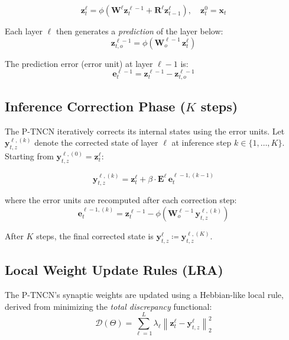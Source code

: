\documentclass[11pt]{article}
\theoremstyle{definition}
\newcommand{\vz}{\mathbf{z}}
\newcommand{\vy}{\mathbf{y}}
\newcommand{\ve}{\mathbf{e}}
\newcommand{\vx}{\mathbf{x}}
\newcommand{\W}{\mathbf{W}}
\newcommand{\R}{\mathbf{R}}
\newcommand{\E}{\mathbf{E}}
\newcommand{\norm}[1]{\left\|#1\right\|}
\begin{document}
\begin{equation}
  \label{eq:state_update}
  \vz^\ell_t = \phi\!\left(\W^\ell \vz^{\ell-1}_t + \R^\ell \vz^\ell_{t-1}\right),
  \quad \vz^0_t = \vx_t
\end{equation}

Each layer $\ell$ then generates a \emph{prediction} of the layer below:
\begin{equation}
  \label{eq:prediction}
  \vz^{\ell-1}_{t,o} = \phi\!\left(\W^{\ell-1}_o \, \vz^\ell_t\right)
\end{equation}

The prediction error (error unit) at layer $\ell-1$ is:
\begin{equation}
  \label{eq:error_unit}
  \ve^{\ell-1}_t = \vz^{\ell-1}_t - \vz^{\ell-1}_{t,o}
\end{equation}

\subsection{Inference Correction Phase ($K$ steps)}

The P-TNCN iteratively corrects its internal states using the error units.
Let $\vy^{\ell,(k)}_{t,z}$ denote the corrected state of layer $\ell$ at
inference step $k \in \{1,\ldots,K\}$. Starting from $\vy^{\ell,(0)}_{t,z} = \vz^\ell_t$:

\begin{equation}
  \label{eq:correction}
  \vy^{\ell,(k)}_{t,z} = \vz^\ell_t + \beta \cdot \E^\ell \, \ve^{\ell-1,(k-1)}_t
\end{equation}

where the error units are recomputed after each correction step:
\begin{equation}
  \ve^{\ell-1,(k)}_t = \vz^{\ell-1}_t - \phi\!\left(\W^{\ell-1}_o \, \vy^{\ell,(k)}_{t,z}\right)
\end{equation}

After $K$ steps, the final corrected state is $\vy^\ell_{t,z} \coloneqq \vy^{\ell,(K)}_{t,z}$.

\subsection{Local Weight Update Rules (LRA)}

The P-TNCN's synaptic weights are updated using a Hebbian-like local rule,
derived from minimizing the \emph{total discrepancy} functional:
\begin{equation}
  \label{eq:total_discrepancy}
  \mathcal{D}(\Theta) = \sum_{\ell=1}^{L} \lambda_\ell \norm{\vz^\ell_t - \vy^\ell_{t,z}}^2_2
\end{equation}
\end{document}
